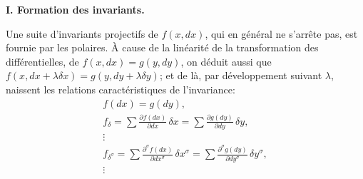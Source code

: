 \begin{center}
\textbf{I. Formation des invariants.}
\end{center}

Une suite d'invariants projectifs de \(f(x,dx)\), qui en général ne s'arrête
pas, est fournie par les polaires. À cause de la linéarité de la transformation
des différentielles, de \(f(x,dx)=g(y,dy)\), on déduit aussi que
\(f(x,dx+\lambda\delta x)=g(y,dy+\lambda\delta y)\); et de là, par
développement suivant \(\lambda\), naissent les relations caractéristiques
de l'invariance:
\begin{equation}
\begin{gathered}
f(dx)=g(dy),\\
f_\delta=\sum\frac{\partial f(dx)}{\partial dx}\,\delta x
       =\sum\frac{\partial g(dy)}{\partial dy}\,\delta y,\\
\vdots\\
f_{\delta^\sigma}=
\sum\frac{\partial^\sigma f(dx)}{\partial dx^\sigma}\,\delta x^\sigma
=
\sum\frac{\partial^\sigma g(dy)}{\partial dy^\sigma}\,\delta y^\sigma,\\
\vdots
\end{gathered}
\tag{2}
\end{equation}

